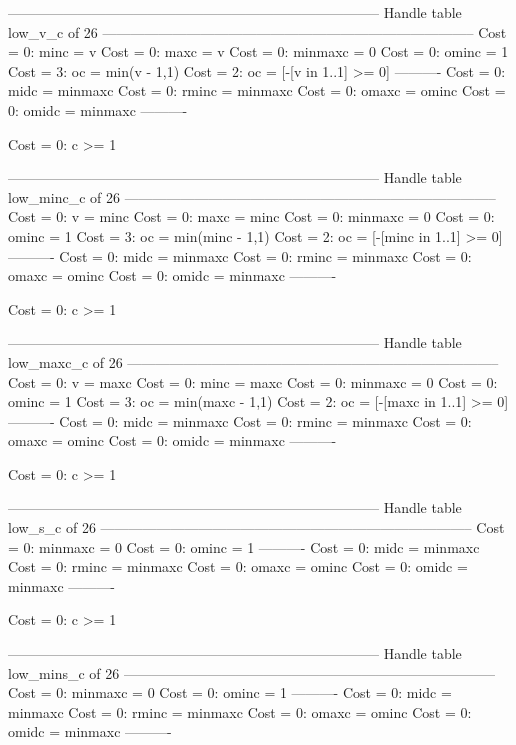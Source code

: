 --------------------------------------------------------------------------------
Handle table low_v_c of 26
--------------------------------------------------------------------------------
Cost =  0:  minc    = v
Cost =  0:  maxc    = v
Cost =  0:  minmaxc = 0
Cost =  0:  ominc   = 1
Cost =  3:  oc      = min(v - 1,1)
Cost =  2:  oc      = [-[v in 1..1] >= 0]
----------
Cost =  0:  midc    = minmaxc
Cost =  0:  rminc   = minmaxc
Cost =  0:  omaxc   = ominc
Cost =  0:  omidc   = minmaxc
----------

Cost =  0:  c >= 1

--------------------------------------------------------------------------------
Handle table low_minc_c of 26
--------------------------------------------------------------------------------
Cost =  0:  v       = minc
Cost =  0:  maxc    = minc
Cost =  0:  minmaxc = 0
Cost =  0:  ominc   = 1
Cost =  3:  oc      = min(minc - 1,1)
Cost =  2:  oc      = [-[minc in 1..1] >= 0]
----------
Cost =  0:  midc    = minmaxc
Cost =  0:  rminc   = minmaxc
Cost =  0:  omaxc   = ominc
Cost =  0:  omidc   = minmaxc
----------

Cost =  0:  c >= 1

--------------------------------------------------------------------------------
Handle table low_maxc_c of 26
--------------------------------------------------------------------------------
Cost =  0:  v       = maxc
Cost =  0:  minc    = maxc
Cost =  0:  minmaxc = 0
Cost =  0:  ominc   = 1
Cost =  3:  oc      = min(maxc - 1,1)
Cost =  2:  oc      = [-[maxc in 1..1] >= 0]
----------
Cost =  0:  midc    = minmaxc
Cost =  0:  rminc   = minmaxc
Cost =  0:  omaxc   = ominc
Cost =  0:  omidc   = minmaxc
----------

Cost =  0:  c >= 1

--------------------------------------------------------------------------------
Handle table low_s_c of 26
--------------------------------------------------------------------------------
Cost =  0:  minmaxc = 0
Cost =  0:  ominc   = 1
----------
Cost =  0:  midc    = minmaxc
Cost =  0:  rminc   = minmaxc
Cost =  0:  omaxc   = ominc
Cost =  0:  omidc   = minmaxc
----------

Cost =  0:  c >= 1

--------------------------------------------------------------------------------
Handle table low_mins_c of 26
--------------------------------------------------------------------------------
Cost =  0:  minmaxc = 0
Cost =  0:  ominc   = 1
----------
Cost =  0:  midc    = minmaxc
Cost =  0:  rminc   = minmaxc
Cost =  0:  omaxc   = ominc
Cost =  0:  omidc   = minmaxc
----------

